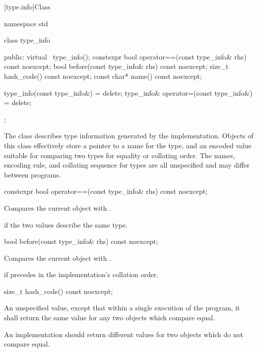 [type.info]{Class }

%
\begin{codeblock}
namespace std {
  class type_info {
  public:
    virtual ~type_info();
    constexpr bool operator==(const type_info& rhs) const noexcept;
    bool before(const type_info& rhs) const noexcept;
    size_t hash_code() const noexcept;
    const char* name() const noexcept;

    type_info(const type_info&) = delete;
    type_info& operator=(const type_info&) = delete;
  };
}
\end{codeblock}

\pnum
The class
describes type information generated by the implementation.
Objects of this class effectively store a pointer to a name for the type, and
an encoded value suitable for comparing two types for equality or collating order.
The names, encoding rule, and collating sequence for types are all unspecified
%
and may differ between programs.

%
\begin{itemdecl}
constexpr bool operator==(const type_info& rhs) const noexcept;
\end{itemdecl}

\begin{itemdescr}
\pnum
\effects
Compares the current object with .

\pnum
\returns
{}
if the two values describe the same type.
\end{itemdescr}

%
\begin{itemdecl}
bool before(const type_info& rhs) const noexcept;
\end{itemdecl}

\begin{itemdescr}
\pnum
\effects
Compares the current object with .

\pnum
\returns
{}
if
precedes  in the implementation's collation order.
\end{itemdescr}

%
\begin{itemdecl}
size_t hash_code() const noexcept;
\end{itemdecl}

\begin{itemdescr}
\pnum
\returns
An unspecified value, except that within a single execution of the
program, it shall return the same value for any two 
objects which compare equal.

\pnum
\remarks
An implementation should return different values for two
 objects which do not compare equal.
\end{itemdescr}


